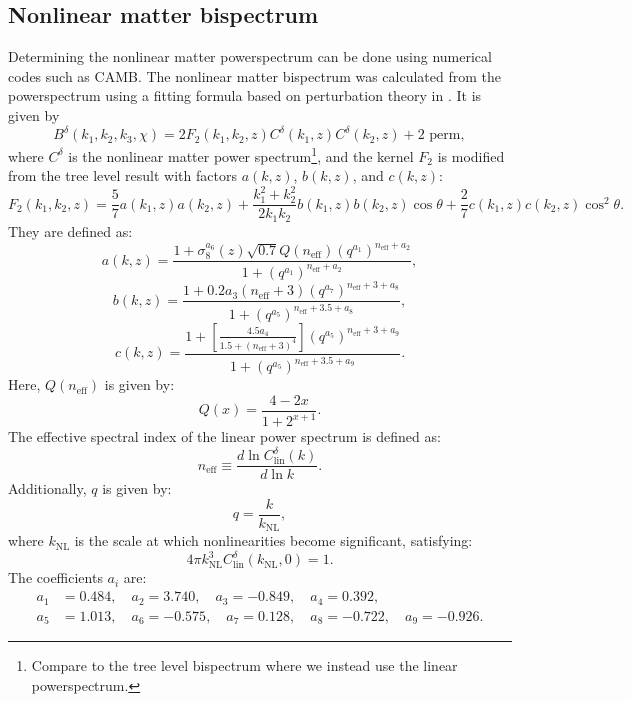 \documentclass[11pt]{article} %
\begin{document}
\subsection{Nonlinear matter bispectrum}
Determining the nonlinear matter powerspectrum can be done using numerical codes such as CAMB. The nonlinear matter bispectrum was calculated from the powerspectrum using a fitting formula based on perturbation theory in \cite{bispfit}. It is given by
\begin{equation}
    B^\delta(k_1, k_2, k_3, \chi) = 2 F_2(k_1, k_2, z) C^\delta(k_1, z) C^\delta(k_2, z) + \text{2 perm},
\end{equation}
where \( C^\delta \) is the nonlinear matter power spectrum\footnote{Compare to the tree level bispectrum where we instead use the linear powerspectrum.}, and the kernel \( F_2 \) is modified from the tree level result with factors \( a(k, z) \), \( b(k, z) \), and \( c(k, z) \):
\begin{equation}
    F_2(k_1, k_2, z) = \frac{5}{7} a(k_1, z) a(k_2, z) + \frac{k_1^2 + k_2^2}{2 k_1 k_2} b(k_1, z) b(k_2, z) \cos \theta + \frac{2}{7} c(k_1, z) c(k_2, z) \cos^2 \theta.
\end{equation}
They are defined as:
\begin{equation}
    a(k, z) = \frac{1 + \sigma_8^{a_6}(z) \sqrt{0.7} Q(n_{\text{eff}}) (q^{a_1})^{n_{\text{eff}} + a_2}}{1 + (q^{a_1})^{n_{\text{eff}} + a_2}},
\end{equation}
\begin{equation}
    b(k, z) = \frac{1 + 0.2 a_3 (n_{\text{eff}} + 3) (q^{a_7})^{n_{\text{eff}} + 3 + a_8}}{1 + (q^{a_5})^{n_{\text{eff}} + 3.5 + a_8}},
\end{equation}
\begin{equation}
    c(k, z) = \frac{1 + \left[ \frac{4.5 a_4}{1.5 + (n_{\text{eff}} + 3)^4} \right] (q^{a_5})^{n_{\text{eff}} + 3 + a_9}}{1 + (q^{a_5})^{n_{\text{eff}} + 3.5 + a_9}}.
\end{equation}
Here, \( Q(n_{\text{eff}}) \) is given by:
\begin{equation}
    Q(x) = \frac{4 - 2x}{1 + 2^{x+1}}.
\end{equation}
The effective spectral index of the linear power spectrum is defined as:
\begin{equation}
    n_{\text{eff}} \equiv \frac{d \ln C^\delta_{\text{lin}}(k)}{d \ln k}.
\end{equation}
Additionally, \( q \) is given by:
\begin{equation}
    q = \frac{k}{k_{\text{NL}}},
\end{equation}
where \( k_{\text{NL}} \) is the scale at which nonlinearities become significant, satisfying:
\begin{equation}
    4 \pi k_{\text{NL}}^3 C^\delta_{\text{lin}}(k_{\text{NL}}, 0) = 1.
\end{equation}
The coefficients \( a_i \) are:
\begin{align*}
    a_1 &= 0.484, \quad a_2 = 3.740, \quad a_3 = -0.849, \quad a_4 = 0.392, \\
    a_5 &= 1.013, \quad a_6 = -0.575, \quad a_7 = 0.128, \quad a_8 = -0.722, \quad a_9 = -0.926.
\end{align*}
\end{document}

